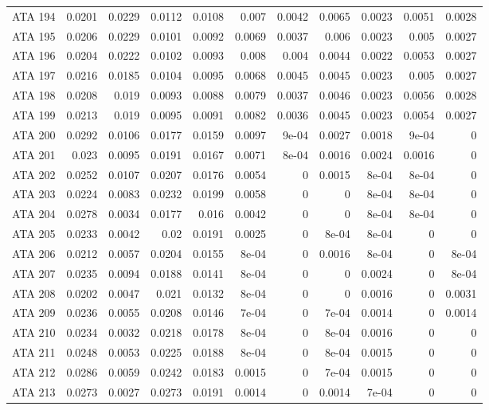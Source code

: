 \begin{landscape}
\begin{longtable}{rrrrrrrrrrr}
  ATA 194 & 0.0201 & 0.0229 & 0.0112 & 0.0108 & 0.007 & 0.0042 & 0.0065 & 0.0023 & 0.0051 & 0.0028 \\ 
  ATA 195 & 0.0206 & 0.0229 & 0.0101 & 0.0092 & 0.0069 & 0.0037 & 0.006 & 0.0023 & 0.005 & 0.0027 \\ 
  ATA 196 & 0.0204 & 0.0222 & 0.0102 & 0.0093 & 0.008 & 0.004 & 0.0044 & 0.0022 & 0.0053 & 0.0027 \\ 
  ATA 197 & 0.0216 & 0.0185 & 0.0104 & 0.0095 & 0.0068 & 0.0045 & 0.0045 & 0.0023 & 0.005 & 0.0027 \\ 
  ATA 198 & 0.0208 & 0.019 & 0.0093 & 0.0088 & 0.0079 & 0.0037 & 0.0046 & 0.0023 & 0.0056 & 0.0028 \\ 
  ATA 199 & 0.0213 & 0.019 & 0.0095 & 0.0091 & 0.0082 & 0.0036 & 0.0045 & 0.0023 & 0.0054 & 0.0027 \\ 
  ATA 200 & 0.0292 & 0.0106 & 0.0177 & 0.0159 & 0.0097 & 9e-04 & 0.0027 & 0.0018 & 9e-04 & 0 \\ 
  ATA 201 & 0.023 & 0.0095 & 0.0191 & 0.0167 & 0.0071 & 8e-04 & 0.0016 & 0.0024 & 0.0016 & 0 \\ 
  ATA 202 & 0.0252 & 0.0107 & 0.0207 & 0.0176 & 0.0054 & 0 & 0.0015 & 8e-04 & 8e-04 & 0 \\ 
  ATA 203 & 0.0224 & 0.0083 & 0.0232 & 0.0199 & 0.0058 & 0 & 0 & 8e-04 & 8e-04 & 0 \\ 
  ATA 204 & 0.0278 & 0.0034 & 0.0177 & 0.016 & 0.0042 & 0 & 0 & 8e-04 & 8e-04 & 0 \\ 
  ATA 205 & 0.0233 & 0.0042 & 0.02 & 0.0191 & 0.0025 & 0 & 8e-04 & 8e-04 & 0 & 0 \\ 
  ATA 206 & 0.0212 & 0.0057 & 0.0204 & 0.0155 & 8e-04 & 0 & 0.0016 & 8e-04 & 0 & 8e-04 \\ 
  ATA 207 & 0.0235 & 0.0094 & 0.0188 & 0.0141 & 8e-04 & 0 & 0 & 0.0024 & 0 & 8e-04 \\ 
  ATA 208 & 0.0202 & 0.0047 & 0.021 & 0.0132 & 8e-04 & 0 & 0 & 0.0016 & 0 & 0.0031 \\ 
  ATA 209 & 0.0236 & 0.0055 & 0.0208 & 0.0146 & 7e-04 & 0 & 7e-04 & 0.0014 & 0 & 0.0014 \\ 
  ATA 210 & 0.0234 & 0.0032 & 0.0218 & 0.0178 & 8e-04 & 0 & 8e-04 & 0.0016 & 0 & 0 \\ 
  ATA 211 & 0.0248 & 0.0053 & 0.0225 & 0.0188 & 8e-04 & 0 & 8e-04 & 0.0015 & 0 & 0 \\ 
  ATA 212 & 0.0286 & 0.0059 & 0.0242 & 0.0183 & 0.0015 & 0 & 7e-04 & 0.0015 & 0 & 0 \\ 
  ATA 213 & 0.0273 & 0.0027 & 0.0273 & 0.0191 & 0.0014 & 0 & 0.0014 & 7e-04 & 0 & 0 \\ 

\end{longtable}
\end{landscape}
